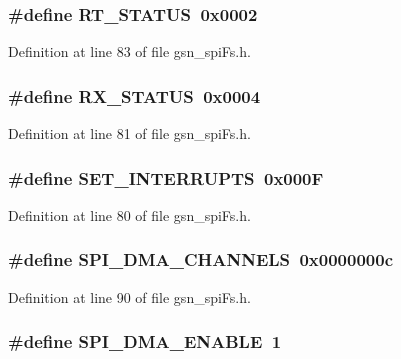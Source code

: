 \hypertarget{a00589_a202d8710d0c6930b5c266948f5712d7a}{
\subsubsection[{RT\_\-STATUS}]{\setlength{\rightskip}{0pt plus 5cm}\#define RT\_\-STATUS~0x0002}}
\label{a00589_a202d8710d0c6930b5c266948f5712d7a}


Definition at line 83 of file gsn\_\-spiFs.h.

\hypertarget{a00589_a731d30ee0b5f9f0471fa8e742ef1784c}{
\subsubsection[{RX\_\-STATUS}]{\setlength{\rightskip}{0pt plus 5cm}\#define RX\_\-STATUS~0x0004}}
\label{a00589_a731d30ee0b5f9f0471fa8e742ef1784c}


Definition at line 81 of file gsn\_\-spiFs.h.

\hypertarget{a00589_a0710240ccdbef200879fbec6fde50342}{
\subsubsection[{SET\_\-INTERRUPTS}]{\setlength{\rightskip}{0pt plus 5cm}\#define SET\_\-INTERRUPTS~0x000F}}
\label{a00589_a0710240ccdbef200879fbec6fde50342}


Definition at line 80 of file gsn\_\-spiFs.h.

\hypertarget{a00589_acc862b4e66ca1cd03299556793dc5be3}{
\subsubsection[{SPI\_\-DMA\_\-CHANNELS}]{\setlength{\rightskip}{0pt plus 5cm}\#define SPI\_\-DMA\_\-CHANNELS~0x0000000c}}
\label{a00589_acc862b4e66ca1cd03299556793dc5be3}


Definition at line 90 of file gsn\_\-spiFs.h.

\hypertarget{a00589_a82dc6617ad4a3ec4336c9739f8657e1c}{
\subsubsection[{SPI\_\-DMA\_\-ENABLE}]{\setlength{\rightskip}{0pt plus 5cm}\#define SPI\_\-DMA\_\-ENABLE~1}}
\label{a00589_a82dc6617ad4a3ec4336c9739f8657e1c}



